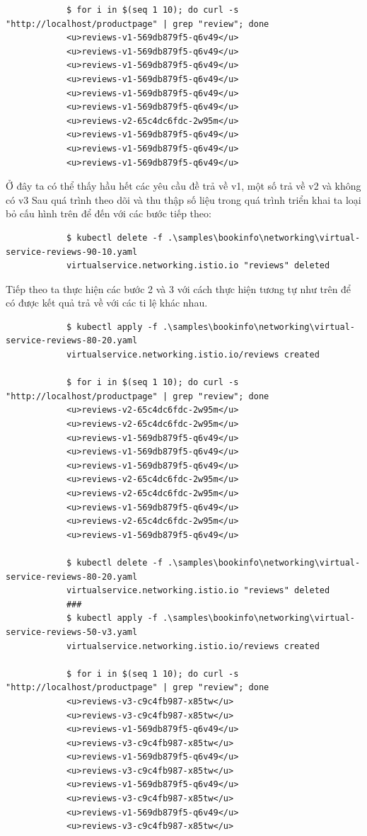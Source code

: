\documentclass[14pt,a4paper]{book}
\begin{document}
{{\begin{lstlisting}
			$ for i in $(seq 1 10); do curl -s "http://localhost/productpage" | grep "review"; done
			<u>reviews-v1-569db879f5-q6v49</u>
			<u>reviews-v1-569db879f5-q6v49</u>
			<u>reviews-v1-569db879f5-q6v49</u>
			<u>reviews-v1-569db879f5-q6v49</u>
			<u>reviews-v1-569db879f5-q6v49</u>
			<u>reviews-v1-569db879f5-q6v49</u>
			<u>reviews-v2-65c4dc6fdc-2w95m</u>
			<u>reviews-v1-569db879f5-q6v49</u>
			<u>reviews-v1-569db879f5-q6v49</u>
			<u>reviews-v1-569db879f5-q6v49</u>
		\end{lstlisting}
		Ở đây ta có thể thấy hầu hết các yêu cầu đề trả về v1, một số trả về v2 và không có v3
		Sau quá trình theo dõi và thu thập số liệu trong quá trình triển khai ta loại bỏ cấu hình trên để đến với các bước tiếp theo:
		\begin{lstlisting}
			$ kubectl delete -f .\samples\bookinfo\networking\virtual-service-reviews-90-10.yaml
			virtualservice.networking.istio.io "reviews" deleted
		\end{lstlisting}
		Tiếp theo ta thực hiện các bước 2 và 3 với cách thực hiện tương tự như trên để có được kết quả trả về với các ti lệ khác nhau.
		\begin{lstlisting}
			$ kubectl apply -f .\samples\bookinfo\networking\virtual-service-reviews-80-20.yaml
			virtualservice.networking.istio.io/reviews created
			
			$ for i in $(seq 1 10); do curl -s "http://localhost/productpage" | grep "review"; done
			<u>reviews-v2-65c4dc6fdc-2w95m</u>
			<u>reviews-v2-65c4dc6fdc-2w95m</u>
			<u>reviews-v1-569db879f5-q6v49</u>
			<u>reviews-v1-569db879f5-q6v49</u>
			<u>reviews-v1-569db879f5-q6v49</u>
			<u>reviews-v2-65c4dc6fdc-2w95m</u>
			<u>reviews-v2-65c4dc6fdc-2w95m</u>
			<u>reviews-v1-569db879f5-q6v49</u>
			<u>reviews-v2-65c4dc6fdc-2w95m</u>
			<u>reviews-v1-569db879f5-q6v49</u>
			
			$ kubectl delete -f .\samples\bookinfo\networking\virtual-service-reviews-80-20.yaml
			virtualservice.networking.istio.io "reviews" deleted
			###
			$ kubectl apply -f .\samples\bookinfo\networking\virtual-service-reviews-50-v3.yaml
			virtualservice.networking.istio.io/reviews created
			
			$ for i in $(seq 1 10); do curl -s "http://localhost/productpage" | grep "review"; done
			<u>reviews-v3-c9c4fb987-x85tw</u>
			<u>reviews-v3-c9c4fb987-x85tw</u>
			<u>reviews-v1-569db879f5-q6v49</u>
			<u>reviews-v3-c9c4fb987-x85tw</u>
			<u>reviews-v1-569db879f5-q6v49</u>
			<u>reviews-v3-c9c4fb987-x85tw</u>
			<u>reviews-v1-569db879f5-q6v49</u>
			<u>reviews-v3-c9c4fb987-x85tw</u>
			<u>reviews-v1-569db879f5-q6v49</u>
			<u>reviews-v3-c9c4fb987-x85tw</u>
			

\end{lstlisting}}}
\end{document}

